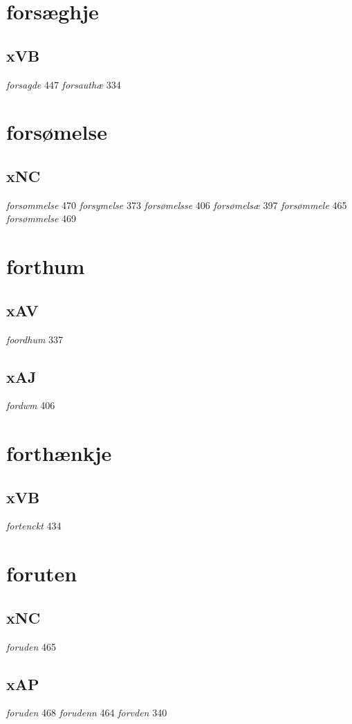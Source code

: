\documentclass[a4paper,twocolumn]{article}
\begin{document}
\section{forsæghje}
\label{sec:org0cb194d}
\subsection{xVB}
\label{sec:orge9e5cb4}
\emph{forsagde} 447 \emph{forsauthæ} 334 
\section{forsømelse}
\label{sec:orgc13831f}
\subsection{xNC}
\label{sec:orgf1dce6a}
\emph{forsommelse} 470 \emph{forsymelse} 373 \emph{forsømelsse} 406 \emph{forsømelsæ} 397 \emph{forsømmele} 465 \emph{forsømmelse} 469 
\section{forthum}
\label{sec:org8e1bde2}
\subsection{xAV}
\label{sec:orgefa3458}
\emph{foordhum} 337 
\subsection{xAJ}
\label{sec:org30b7a91}
\emph{fordwm} 406 
\section{forthænkje}
\label{sec:orgb4e6c4f}
\subsection{xVB}
\label{sec:orgc0a8501}
\emph{fortenckt} 434 
\section{foruten}
\label{sec:orgfd77dbd}
\subsection{xNC}
\label{sec:orgf3da5c0}
\emph{foruden} 465 
\subsection{xAP}
\label{sec:orgb0ae6df}
\emph{foruden} 468 \emph{forudenn} 464 \emph{forvden} 340 
\end{document}
